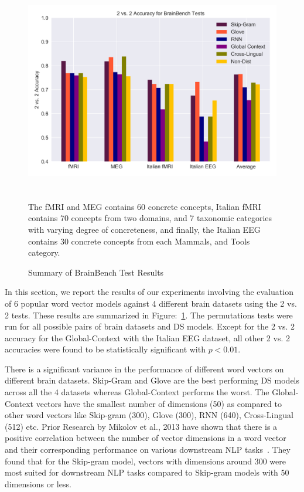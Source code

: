 \begin{figure}[!t]
\centering
\includegraphics[width=14cm, height=9cm]{Figures/BrainBenchSummary1}
\caption{Summary of BrainBench Test Results}
\label{BrainBenchSummary}
The fMRI and MEG contains 60 concrete concepts, Italian fMRI contains 70 concepts from two domains, and 7 taxonomic categories with varying degree of concreteness, and finally, the Italian EEG contains 30 concrete concepts from each Mammals, and Tools category.
\end{figure}
In this section, we report the results of our experiments involving the evaluation of 6 popular word vector models against 4 different brain datasets using the 2 vs. 2 tests. These results are summarized in Figure:~\ref{BrainBenchSummary}.  The permutations tests were run for all possible pairs of brain datasets and DS models. Except for the 2 vs. 2 accuracy for the Global-Context with the Italian EEG dataset, all other 2 vs. 2 accuracies were found to be statistically significant with $p<0.01$.

There is a significant variance in the performance of different word vectors on different brain datasets. Skip-Gram and Glove are the best performing DS models across all the 4 datasets whereas Global-Context performs the worst. The Global-Context vectors have the smallest number of dimensions (50) as compared to other word vectors like Skip-gram (300), Glove (300), RNN (640), Cross-Lingual (512) etc. Prior Research by Mikolov et al., 2013 have shown that there is a positive correlation between the number of vector dimensions in a word vector and their corresponding performance on various downstream NLP tasks~\cite{Word2Vec}. They found that for the Skip-gram model, vectors with dimensions around 300 were most suited for downstream NLP tasks compared to Skip-gram models with 50 dimensions or less. 





